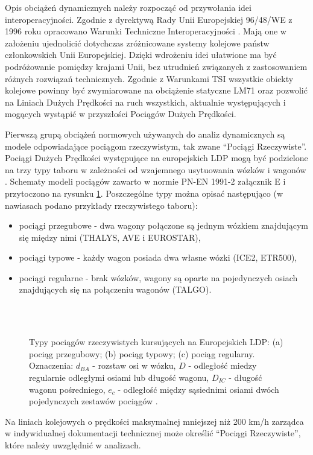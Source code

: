 Opis obciążeń dynamicznych należy rozpocząć od przywołania idei interoperacyjności. Zgodnie z dyrektywą Rady Unii Europejskiej 96/48/WE z 1996 roku opracowano Warunki Techniczne Interoperacyjności  \parencite{Muncke2008}. Mają one w założeniu ujednolicić dotychczas zróżnicowane systemy kolejowe państw członkowskich Unii Europejskiej. Dzięki wdrożeniu idei ułatwione ma być podróżowanie pomiędzy krajami Unii, bez utrudnień związanych z zastosowaniem różnych rozwiązań technicznych. Zgodnie z Warunkami TSI wszystkie obiekty kolejowe powinny być zwymiarowane na obciążenie statyczne LM71 oraz pozwolić na Liniach Dużych Prędkości na ruch wszystkich, aktualnie występujących i mogących wystąpić w przyszłości Pociągów Dużych Prędkości.

Pierwszą grupą obciążeń normowych używanych do analiz dynamicznych są modele odpowiadające pociągom rzeczywistym, tak zwane \enquote{Pociągi Rzeczywiste}. Pociągi Dużych Prędkości występujące na europejskich LDP mogą być podzielone na trzy typy taboru w zależności od wzajemnego usytuowania wózków i wagonów \parencite{Goicolea2008a}. Schematy modeli pociągów zawarto w normie PN-EN 1991-2 załącznik E i przytoczono na rysunku \ref{fig:train_types_EC}. Poszczególne typy można opisać następująco (w nawiasach podano przykłady rzeczywistego taboru):
\begin{itemize} 
	\item pociągi przegubowe - dwa wagony połączone są jednym wózkiem znajdującym się między nimi (THALYS, AVE i EUROSTAR),
	\item pociągi typowe - każdy wagon posiada dwa własne wózki (ICE2, ETR500),
	\item pociągi regularne - brak wózków, wagony są oparte na pojedynczych osiach znajdujących się na połączeniu wagonów (TALGO).
\end{itemize}
\begin{figure}[hbt!]
	\centering
	 \\
	 \\
	\captionsetup{justification=centering}
	\caption{Typy pociągów rzeczywistych kursujących na Europejskich LDP: (a) pociąg przegubowy; (b) pociąg typowy; (c) pociąg regularny. Oznaczenia: $d_{BA}$ - rozstaw osi w wózku, $D$ - odległość miedzy regularnie odległymi osiami lub długość wagonu, $D_{IC}$ - długość wagonu pośredniego, $e_c$ - odległość między sąsiednimi osiami dwóch pojedynczych zestawów pociągów \parencite{PKNj}.}
	\label{fig:train_types_EC}
\end{figure}
Na liniach kolejowych o prędkości maksymalnej mniejszej niż 200 km/h zarządca w indywidualnej dokumentacji technicznej może określić \enquote{Pociągi Rzeczywiste}, które należy uwzględnić w analizach.

